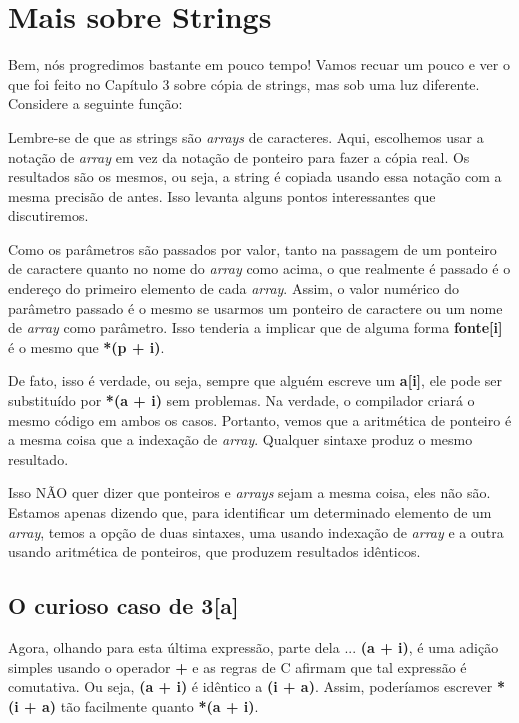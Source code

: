 
\chapter{Mais sobre Strings}
Bem, nós progredimos bastante em pouco tempo! Vamos recuar um pouco e ver o que foi feito no Capítulo 3 sobre cópia de strings, mas sob uma luz diferente. Considere a seguinte função:


Lembre-se de que as strings são \textit{arrays} de caracteres. Aqui, escolhemos usar a notação de \textit{array} em vez da notação de ponteiro para fazer a cópia real. Os resultados são os mesmos, ou seja, a string é copiada usando essa notação com a mesma precisão de antes. Isso levanta alguns pontos interessantes que discutiremos.

Como os parâmetros são passados por valor, tanto na passagem de um ponteiro de caractere quanto no nome do \textit{array} como acima, o que realmente é passado é o endereço do primeiro elemento de cada \textit{array}. Assim, o valor numérico do parâmetro passado é o mesmo se usarmos um ponteiro de caractere ou um nome de \textit{array} como parâmetro. Isso tenderia a implicar que de alguma forma \textbf{fonte[i]} é o mesmo que \textbf{*(p + i)}.

De fato, isso é verdade, ou seja, sempre que alguém escreve um \textbf{a[i]}, ele pode ser substituído por \textbf{*(a + i)} sem problemas. Na verdade, o compilador criará o mesmo código em ambos os casos. Portanto, vemos que a aritmética de ponteiro é a mesma coisa que a indexação de \textit{array}. Qualquer sintaxe produz o mesmo resultado.

Isso NÃO quer dizer que ponteiros e \textit{arrays} sejam a mesma coisa, eles não são. Estamos apenas dizendo que, para identificar um determinado elemento de um \textit{array}, temos a opção de duas sintaxes, uma usando indexação de \textit{array} e a outra usando aritmética de ponteiros, que produzem resultados idênticos.

\section{O curioso caso de 3[a]}

Agora, olhando para esta última expressão, parte dela ... \textbf{(a + i)}, é uma adição simples usando o operador \textbf{+} e as regras de C afirmam que tal expressão é comutativa. Ou seja, \textbf{(a + i)} é idêntico a \textbf{(i + a)}. Assim, poderíamos escrever \textbf{*(i + a)} tão facilmente quanto \textbf{*(a + i)}.

